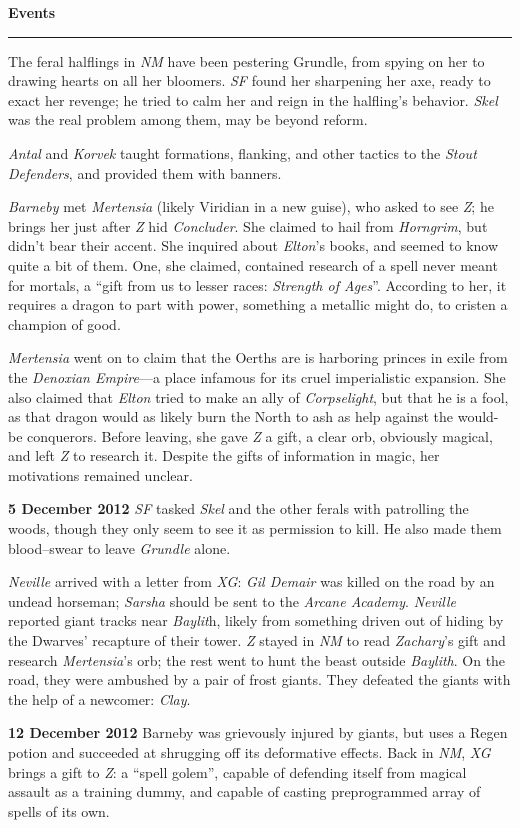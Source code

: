 \documentclass[letterpaper]{article}
\newcommand{\e}[1]{\emph{#1}}
\newcommand{\B}[1]{\textbf{#1}}
\newenvironment{notesection}[1]
{ {\huge \B{#1}}\hrule\vspace{0.5em}\begingroup\fontsize{9pt}{12pt}\selectfont}
{\endgroup}
\begin{document}
\begin{notesection}{Events}
The feral halflings in \e{NM} have been pestering Grundle, from spying on her to drawing hearts on all her bloomers. \e{SF} found her sharpening her axe, ready to exact her revenge; he tried to calm her and reign in the halfling's behavior. \e{Skel} was the real problem among them, may be beyond reform.

\e{Antal} and \e{Korvek} taught formations, flanking, and other tactics to the \e{Stout Defenders}, and provided them with banners.

\e{Barneby} met \e{Mertensia} (likely Viridian in a new guise), who asked to see \e{Z}; he brings her just after \e{Z} hid \e{Concluder}. She claimed to hail from \e{Horngrim}, but didn't bear their accent. She inquired about \e{Elton}'s books, and seemed to know quite a bit of them. One, she claimed, contained research of a spell never meant for mortals, a ``gift from us to lesser races: \e{Strength of Ages}''. According to her, it requires a dragon to part with power, something a metallic might do, to cristen a champion of good.

\e{Mertensia} went on to claim that the Oerths are is harboring princes in exile from the \e{Denoxian Empire}---a place infamous for its cruel imperialistic expansion.  She also claimed that \e{Elton} tried to make an ally of \e{Corpselight}, but that he is a fool, as that dragon would as likely burn the North to ash as help against the would-be conquerors. Before leaving, she gave \e{Z} a gift, a clear orb, obviously magical, and left \e{Z} to research it. Despite the gifts of information in magic, her motivations remained unclear.

\B{5 December 2012} \e{SF} tasked \e{Skel} and the other ferals with patrolling the woods, though they only seem to see it as permission to kill. He also made them blood--swear to leave \e{Grundle} alone.

\e{Neville} arrived with a letter from \e{XG}: \e{Gil Demair} was killed on the road by an undead horseman; \e{Sarsha} should be sent to the \e{Arcane Academy}. \e{Neville} reported giant tracks near \e{Baylit}h, likely from something driven out of hiding by the Dwarves' recapture of their tower.  \e{Z} stayed in \e{NM} to read \e{Zachary}'s gift and research \e{Mertensia}'s orb; the rest went to hunt the beast outside \e{Baylith}. On the road, they were ambushed by a pair of frost giants. They defeated the giants with the help of a newcomer: \e{Clay}.

\B{12 December 2012} Barneby was grievously injured by giants, but uses a Regen potion and succeeded at shrugging off its deformative effects. Back in \e{NM}, \e{XG} brings a gift to \e{Z}: a ``spell golem'', capable of defending itself from magical assault as a training dummy, and capable of casting preprogrammed array of spells of its own.


\end{notesection}
\end{document}
